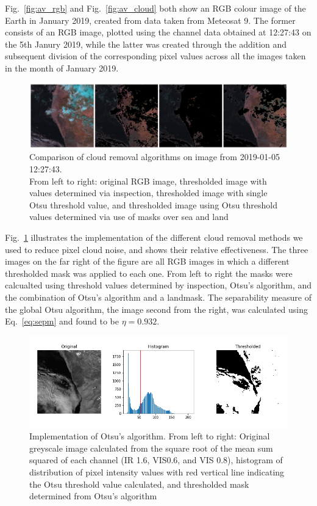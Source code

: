 Fig.~\ref{fig:av_rgb} and Fig.~\ref{fig:av_cloud} both show an RGB colour image of the Earth in January 2019, created from data taken from Meteosat 9. The former consists of an RGB image, plotted using the channel data obtained at 12:27:43 on the 5th Janury 2019, while the latter was created through the addition and subsequent division of the corresponding pixel values across all the images taken in the month of January 2019. 

\begin{figure}[h]
    \centering
    \includegraphics[width=1\textwidth]{compare_removal.png}
    \caption{Comparison of cloud removal algorithms on image from 2019-01-05 12:27:43.
    \\From left to right: original RGB image, thresholded image with values determined via inspection, thresholded image with single Otsu threshold value, and thresholded image using Otsu threshold values determined via use of masks over sea and land}
    \label{fig:iterav}
\end{figure}

Fig.~\ref{fig:iterav} illustrates the implementation of the different cloud removal methods we used to reduce pixel cloud noise, and shows their relative effectiveness. The three images on the far right of the figure are all RGB images in which a different thresholded mask was applied to each one. From left to right the masks were calcualted using threshold values determined by inspection, Otsu's algorithm, and the combination of Otsu's algorithm and a landmask. The separability measure of the global Otsu algorithm, the image second from the right, was calculated using Eq.~\ref{eq:sepm} and found to be $\eta = 0.932$.

\begin{figure}[h]
    \centering
    \includegraphics[width=1\textwidth]{g_Otsu_sealand_fail.png}
    \caption{Implementation of Otsu's algorithm. From left to right: Original greyscale image calculated from the square root of the mean sum squared of each channel (IR 1.6, VIS0.6, and VIS 0.8), histogram of distribution of pixel intensity values with red vertical line indicating the Otsu threshold value calculated, and thresholded mask determined from Otsu's algorithm}
    \label{fig:g_Otsu_fail}
\end{figure}

